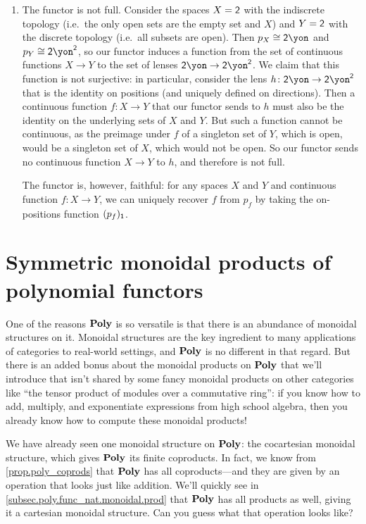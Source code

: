 \documentclass[Book-Poly]{subfiles}
\begin{document}
\begin{exercise}
\begin{solution}
\begin{enumerate}
	\item The functor is not full.
	Consider the spaces $X = \textsf{2}$ with the indiscrete topology (i.e.\ the only open sets are the empty set and $X$) and $Y = \textsf{2}$ with the discrete topology (i.e.\ all subsets are open).
	Then $p_X \iso \2\yon$ and $p_Y \iso \2\yon^\2$, so our functor induces a function from the set of continuous functions $X \to Y$ to the set of lenses $\2\yon \to \2\yon^\2$.
	We claim that this function is not surjective: in particular, consider the lens $h \colon \2\yon \to \2\yon^\2$ that is the identity on positions (and uniquely defined on directions).
	Then a continuous function $f \colon X \to Y$ that our functor sends to $h$ must also be the identity on the underlying sets of $X$ and $Y$.
	But such a function cannot be continuous, as the preimage under $f$ of a singleton set of $Y$, which is open, would be a singleton set of $X$, which would not be open. 
	So our functor sends no continuous function $X \to Y$ to $h$, and therefore is not full.
	
	The functor is, however, faithful: for any spaces $X$ and $Y$ and continuous function $f \colon X \to Y$, we can uniquely recover $f$ from $p_f$ by taking the on-positions function $(p_f)_{\textsf{1}}$.
\end{enumerate}
\end{solution}
\end{exercise}

\section{Symmetric monoidal products of polynomial functors} \label{sec.poly.func_nat.monoidal}

One of the reasons $\mathbf{Poly}$ is so versatile is that there is an abundance of monoidal structures on it.
Monoidal structures are the key ingredient to many applications of categories to real-world settings, and $\mathbf{Poly}$ is no different in that regard.
But there is an added bonus about the monoidal products on $\mathbf{Poly}$ that we'll introduce that isn't shared by some fancy monoidal products on other categories like ``the tensor product of modules over a commutative ring'': if you know how to add, multiply, and exponentiate expressions from high school algebra, then you already know how to compute these monoidal products!

We have already seen one monoidal structure on $\mathbf{Poly}$: the cocartesian monoidal structure, which gives $\mathbf{Poly}$ its finite coproducts.
In fact, we know from \cref{prop.poly_coprods} that $\mathbf{Poly}$ has all coproducts---and they are given by an operation that looks just like addition.
We'll quickly see in \cref{subsec.poly.func_nat.monoidal.prod} that $\mathbf{Poly}$ has all products as well, giving it a cartesian monoidal structure.
Can you guess what that operation looks like?
\end{document}
